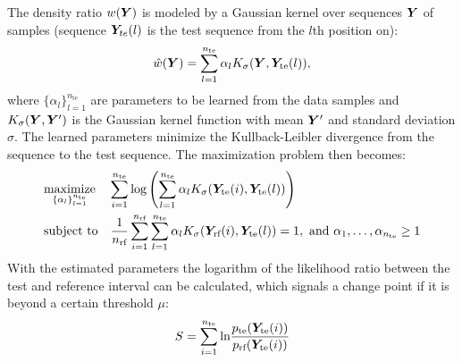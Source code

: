 The density ratio $w(\matrixsym{Y})$ is modeled by a Gaussian kernel over sequences $\matrixsym{Y}$ of samples (sequence $\matrixsym{Y}_{te}(l)$ is the test sequence from the $l$th position on):
%
\begin{equation}
  \hat{w}(\matrixsym{Y}) = \sum_{l=1}^{n_\text{te}} \alpha_l K_\sigma(\matrixsym{Y}, \matrixsym{Y}_\text{te}(l)),
\end{equation}
%
where $\{\alpha_l\}_{l=1}^{n_\text{te}}$ are parameters to be learned from the data samples and $K_\sigma(\matrixsym{Y}, \matrixsym{Y}')$ is the Gaussian kernel function with mean $\matrixsym{Y}'$ and standard deviation $\sigma$.
The learned parameters minimize the Kullback-Leibler divergence from the sequence to the test sequence.
The maximization problem then becomes:
%
\begin{equation}
  \maximize{\{\alpha_l\}_{l=1}^{n_\text{te}}}
    {\sum_{i=1}^{n_\text{te}} \text{log} \left(\sum_{l=1}^{n_\text{te}} \alpha_l K_\sigma(\matrixsym{Y}_\text{te}(i), \matrixsym{Y}_\text{te}(l) ) \right)}
    {\frac{1}{n_\text{rf}} \sum_{i=1}^{n_\text{rf}} \sum_{l=1}^{n_\text{te}} \alpha_l K_\sigma(\matrixsym{Y}_\text{rf}(i), \matrixsym{Y}_\text{te}(l)) = 1, ~ \text{and} ~ \alpha_1, \dots ,\alpha_{n_\text{te}} \geq 1}
\end{equation}
%
With the estimated parameters the logarithm of the likelihood ratio between the test and reference interval can be calculated, which signals a change point if it is beyond a certain threshold $\mu$:
%
\begin{equation}
  S = \sum_{i=1}^{n_\text{te}} \text{ln}
    \frac
    {p_\text{te}(\matrixsym{Y}_\text{te}(i))}
    {p_\text{rf}(\matrixsym{Y}_\text{te}(i))}
\end{equation}







\clearpage

